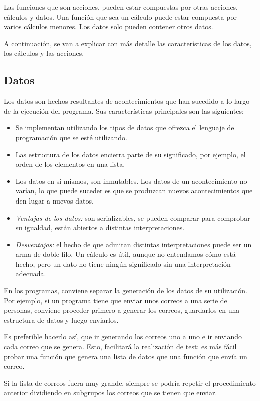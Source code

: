 Las funciones que son acciones, pueden estar compuestas por otras acciones, cálculos y datos. Una función que sea un cálculo puede estar compuesta por varios cálculos menores. Los datos solo pueden contener otros datos.

A continuación, se van a explicar con más detalle las características de los datos, los cálculos y las 
acciones.

\subsection{Datos}
Los datos son hechos resultantes de acontecimientos que han sucedido a lo largo de la ejecución del programa. Sus características principales son las siguientes:
\begin{itemize}
   \item Se implementan utilizando los tipos de datos que ofrezca el lenguaje de programación que se esté utilizando.
   \item Las estructura de los datos encierra parte de su significado, por ejemplo, el orden de los elementos en una lista.
   \item Los datos en sí mismos, son inmutables. Los datos de un acontecimiento no varían, lo que puede suceder es que se produzcan nuevos acontecimientos que den lugar a nuevos datos.
   \item \textit{Ventajas de los datos:} son serializables, se pueden comparar para comprobar su igualdad, están abiertos a distintas interpretaciones.
   \item \textit{Desventajas:} el hecho de que admitan distintas interpretaciones puede ser un arma de doble filo. Un cálculo es útil, aunque no entendamos cómo está hecho, pero un dato no tiene ningún significado sin una interpretación adecuada.
\end{itemize}

En los programas, conviene separar la generación de los datos de su utilización. Por ejemplo, si un programa tiene que enviar unos correos a una serie de personas, conviene proceder primero a generar los correos, guardarlos en una estructura de datos y luego enviarlos. 

Es preferible hacerlo así, que ir generando los correos uno a uno e ir enviando cada correo que se genera. Esto, facilitará la realización de test: es más fácil probar una función que genera una lista de datos que una función que envía un correo.

Si la lista de correos fuera muy grande, siempre se podría repetir el procedimiento anterior dividiendo en subgrupos los correos que se tienen que enviar.

